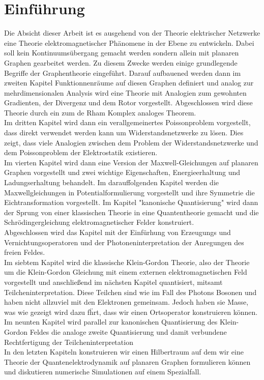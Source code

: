 \documentclass[11pt,a4paper,leqno]{report}
\numberwithin{equation}{chapter}
\begin{document}
\chapter*{Einf\"uhrung}
Die Absicht dieser Arbeit ist es ausgehend von der Theorie elektrischer Netzwerke eine Theorie elektromagnetischer Ph\"anomene in der Ebene zu entwickeln. Dabei soll kein Kontinuums\"ubergang gemacht werden sondern allein mit planaren Graphen gearbeitet werden. Zu diesem Zwecke werden einige grundlegende Begriffe der Graphentheorie eingef\"uhrt. Darauf aufbauened werden dann im zweiten Kapitel Funktionnenr\"aume auf diesen Graphen definiert und analog zur mehrdimensionalen Analysis wird eine Theorie mit Analogien zum gewohnten Gradienten, der Divergenz und dem Rotor vorgestellt. Abgeschlossen wird diese Theorie durch ein zum de Rham Komplex analoges Theorem. \\Im dritten Kapitel wird dann ein verallgemeinertes Poissonproblem vorgestellt, dass direkt verwendet werden kann um Widerstandsnetzwerke zu l\"osen. Dies zeigt, dass viele Analogien zwischen dem Problem der Widerstandsnetzwerke und dem Poissonproblem der Elektrostatik existieren.\\
Im vierten Kapitel wird dann eine Version der Maxwell-Gleichungen auf planaren Graphen vorgestellt und zwei wichtige Eigenschaften, Energieerhaltung und Ladungserhaltung behandelt.
Im darauffolgenden Kapitel werden die Maxwellgleichungen in Potentialformulierung vorgestellt und ihre Symmetrie die Eichtransformation vorgestellt.
Im Kapitel "kanonische Quantisierung" wird dann der Sprung von einer klassischen Theorie in eine Quantentheorie gemacht und die Schr\"odingergleichung elektromagnetischer Felder konstruiert.\\
Abgeschlossen wird das Kapitel mit der Einf\"urhung von Erzeugungs und Vernichtungsoperatoren und der Photoneninterpretation der Anregungen des freien Feldes.\\
Im siebtem Kapitel wird die klassische Klein-Gordon Theorie, also der Theorie um die Klein-Gordon Gleichung mit einem externen elektromagnetischen Feld vorgestellt und anschlie\ss{}end im n\"achsten Kapitel quantisiert, mitsamt Teilcheninterpretation. Diese Teilchen sind wie im Fall des Photons Bosonen und haben nicht allzuviel mit den Elektronen gemeinsam. Jedoch haben sie Masse, was wie gezeigt wird dazu f\"hrt, dass wir einen Ortsoperator konstruieren k\"onnen.\\
Im neunten Kapitel wird parallel zur kanonischen Quantisierung des Klein-Gordon Feldes die analoge zweite Quantisierung und damit verbundene Rechtfertigung der Teilcheninterpretation\\
In den letzten Kapiteln konstruieren wir einen Hilbertraum auf dem wir eine Theorie der Quantenelektrodynamik auf planaren Graphen formulieren k\"onnen und diskutieren numerische Simulationen auf einem Spezialfall.
\end{document}
